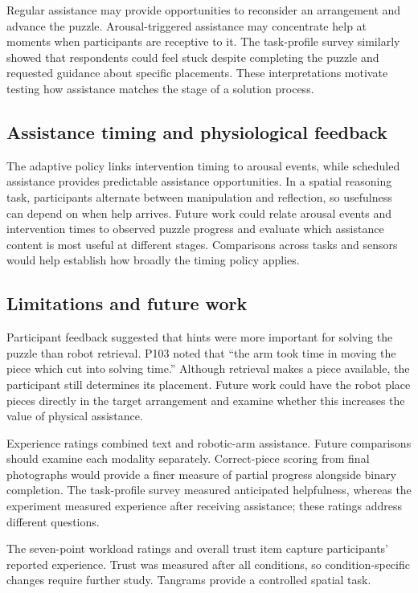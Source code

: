 \documentclass[sigconf]{aamas}
\begin{document}
Regular assistance may provide opportunities to reconsider an arrangement and advance the puzzle. Arousal-triggered assistance may concentrate help at moments when participants are receptive to it. The task-profile survey similarly showed that respondents could feel stuck despite completing the puzzle and requested guidance about specific placements. These interpretations motivate testing how assistance matches the stage of a solution process.

\subsection{Assistance timing and physiological feedback}

The adaptive policy links intervention timing to arousal events, while scheduled assistance provides predictable assistance opportunities. In a spatial reasoning task, participants alternate between manipulation and reflection, so usefulness can depend on when help arrives. Future work could relate arousal events and intervention times to observed puzzle progress and evaluate which assistance content is most useful at different stages. Comparisons across tasks and sensors would help establish how broadly the timing policy applies.

\subsection{Limitations and future work}

Participant feedback suggested that hints were more important for solving the puzzle than robot retrieval. P103 noted that ``the arm took time in moving the piece which cut into solving time.'' Although retrieval makes a piece available, the participant still determines its placement. Future work could have the robot place pieces directly in the target arrangement and examine whether this increases the value of physical assistance.

Experience ratings combined text and robotic-arm assistance. Future comparisons should examine each modality separately. Correct-piece scoring from final photographs would provide a finer measure of partial progress alongside binary completion. The task-profile survey measured anticipated helpfulness, whereas the experiment measured experience after receiving assistance; these ratings address different questions.

The seven-point workload ratings and overall trust item capture participants' reported experience. Trust was measured after all conditions, so condition-specific changes require further study. Tangrams provide a controlled spatial task.
\end{document}
